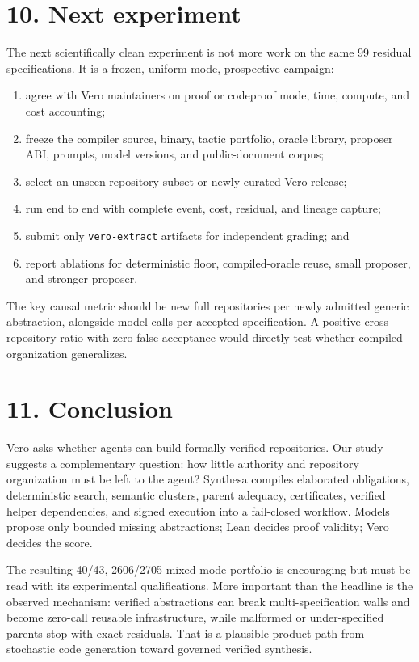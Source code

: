 \documentclass[
  10pt,
]{article}
\providecommand{\tightlist}{%
  \setlength{\itemsep}{0pt}\setlength{\parskip}{0pt}}
\begin{document}
\section{10. Next experiment}\label{next-experiment}

The next scientifically clean experiment is not more work on the same 99
residual specifications. It is a frozen, uniform-mode, prospective
campaign:

\begin{enumerate}
\def\labelenumi{\arabic{enumi}.}
\tightlist
\item
  agree with Vero maintainers on proof or codeproof mode, time, compute,
  and cost accounting;
\item
  freeze the compiler source, binary, tactic portfolio, oracle library,
  proposer ABI, prompts, model versions, and public-document corpus;
\item
  select an unseen repository subset or newly curated Vero release;
\item
  run end to end with complete event, cost, residual, and lineage
  capture;
\item
  submit only \texttt{vero-extract} artifacts for independent grading;
  and
\item
  report ablations for deterministic floor, compiled-oracle reuse, small
  proposer, and stronger proposer.
\end{enumerate}

The key causal metric should be new full repositories per newly admitted
generic abstraction, alongside model calls per accepted specification. A
positive cross-repository ratio with zero false acceptance would
directly test whether compiled organization generalizes.

\section{11. Conclusion}\label{conclusion}

Vero asks whether agents can build formally verified repositories. Our
study suggests a complementary question: how little authority and
repository organization must be left to the agent? Synthesa compiles
elaborated obligations, deterministic search, semantic clusters, parent
adequacy, certificates, verified helper dependencies, and signed
execution into a fail-closed workflow. Models propose only bounded
missing abstractions; Lean decides proof validity; Vero decides the
score.

The resulting 40/43, 2606/2705 mixed-mode portfolio is encouraging but
must be read with its experimental qualifications. More important than
the headline is the observed mechanism: verified abstractions can break
multi-specification walls and become zero-call reusable infrastructure,
while malformed or under-specified parents stop with exact residuals.
That is a plausible product path from stochastic code generation toward
governed verified synthesis.
\end{document}
